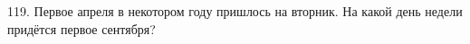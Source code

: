 119. Первое апреля в некотором году пришлось на вторник. На какой день недели придётся первое сентября?\\
